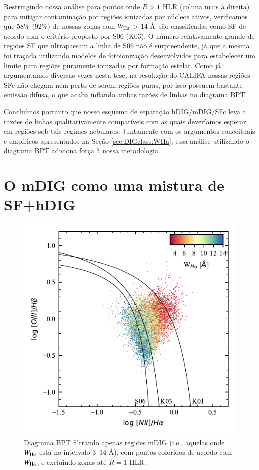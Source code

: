 Restringindo nossa análise para pontos onde $R > 1$ HLR (coluna mais à direita) para mitigar contaminação por regiões ionizadas por núcleos ativos, verificamos que 58\% (92\%) de nossas zonas com $W_{\Ha}$ > 14 \AA\ são classificadas como SF de acordo com o critério proposto por S06 (K03). O número relativamente grande de regiões SF que ultrapassam a linha de S06 não é surpreendente, já que a mesma foi traçada utilizando modelos de fotoionização desenvolvidos para estabelecer um limite para regiões puramente ionizadas por formação estelar. Como já argumentamos diversas vezes nesta tese, na resolução do CALIFA nossas regiões SFc não chegam nem perto de serem regiões \hii puras, por isso possuem bastante emissão difusa, o que acaba inflando ambas razões de linhas no diagrama BPT.

Concluímos portanto que nosso esquema de separação hDIG/mDIG/SFc leva a razões de linhas qualitativamente compatíveis com as quais deveríamos esperar em regiões sob tais regimes nebulares. Juntamente com os argumentos conceituais e empíricos apresentados na Seção \ref{sec:DIGclass:WHa}, essa análise utilizando o diagrama BPT adiciona força à nossa metodologia.


\section{O mDIG como uma mistura de SF+hDIG}
\label{sec:DIGdisc:mDIG}

\begin{figure}
 \includegraphics{figuras/fig_BPT_mixed.pdf}
 \caption[Diagrama BPT -- mDIG]
 {Diagrama BPT filtrando apenas regiões mDIG (i.e., aquelas onde $W_{\Ha}$ está no intervalo 3--14 \AA), com pontos coloridos de acordo com $W_{\Ha}$, e excluindo zonas até $R = 1$ HLR.}
 \label{fig:BPT_mDIG}
\end{figure}

